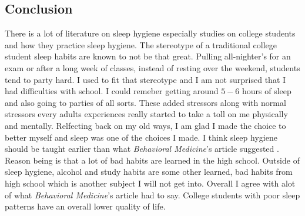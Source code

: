 \documentclass[a4paper,man,biblatex]{apa6}
\begin{document}
\subsection{Conclusion} There is a lot of literature on sleep hygiene especially studies on college students and how they practice sleep hygiene. The stereotype of a traditional college student sleep habits are known to not be that great. Pulling all-nighter's for an exam or after a long week of classes, instead of resting over the weekend, students tend to party hard. I used to fit that stereotype and I am not surprised that I had difficulties with school. I could remeber getting around $5-6$ hours of sleep and also going to parties of all sorts. These added stressors along with normal stressors every adults experiences really started to take a toll on me physically and mentally. Relfecting back on my old ways, I am glad I made the choice to better myself and sleep was one of the choices I made. I think sleep hygiene should be taught earlier than what \textit{Behavioral Medicine}'s article suggested \autocite{sleep101}. Reason being is that a lot of bad habits are learned in the high school. Outside of sleep hygiene, alcohol and study habits are some other learned, bad habits from high school which is another subject I will not get into. Overall I agree with alot of what \textit{Behavioral Medicine}'s article had to say. College students with poor sleep patterns have an overall lower quality of life.

\printbibliography
\end{document}
